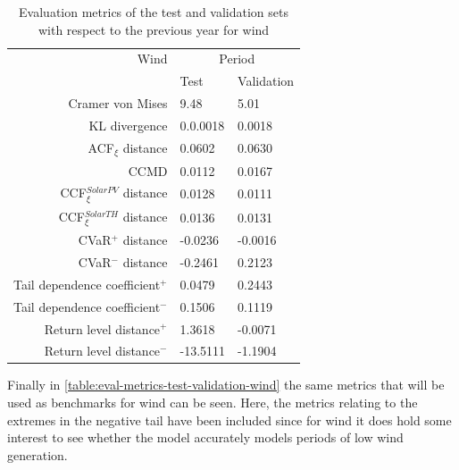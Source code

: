 \begin{table}[ht]
    \centering
    \begin{tabular}{rll}
        \toprule
        Wind & \multicolumn{2}{c}{Period} \\ 
        \cmidrule(lr){2-3}
            & Test & Validation \\
        \midrule
        Cramer von Mises & 9.48 & 5.01 \\
        KL divergence & 0.0.0018 & 0.0018 \\
        ACF$_\xi$ distance & 0.0602 & 0.0630 \\
        \midrule
        CCMD & 0.0112 & 0.0167 \\
        CCF$_\xi^{Solar PV}$ distance & 0.0128 & 0.0111 \\
        CCF$_\xi^{Solar TH}$ distance & 0.0136 & 0.0131 \\
        \midrule
        CVaR$^+$ distance & -0.0236 & -0.0016 \\
        CVaR$^-$ distance & -0.2461 & 0.2123 \\
        Tail dependence coefficient$^+$ & 0.0479 & 0.2443 \\
        Tail dependence coefficient$^-$ & 0.1506 & 0.1119 \\
        Return level distance$^+$ & 1.3618 & -0.0071 \\
        Return level distance$^-$ & -13.5111 & -1.1904 \\
        \bottomrule
    \end{tabular}
    \caption{Evaluation metrics of the test and validation sets with respect to the previous year for wind}
    \label{table:eval-metrics-test-validation-wind}
\end{table}

Finally in \autoref{table:eval-metrics-test-validation-wind} the same metrics that will be used as benchmarks for wind can be seen. Here, the metrics relating to the extremes in the negative tail have been included since for wind it does hold some interest to see whether the model accurately models periods of low wind generation.